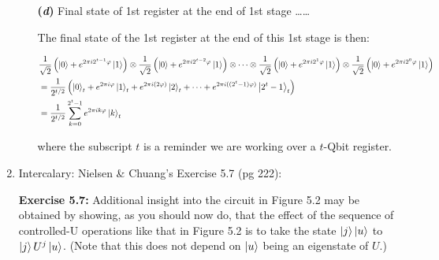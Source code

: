\documentclass{article}
\begin{document}
\begin{enumerate}[label=\textbf{(\arabic*)}]
\begin{itemize}
\vspace{0.1in}

\item[\textbf{(\textit{d})}] Final state of 1st register at the end of 1st stage \ldots \ldots
  
  \vspace{0.05in}
  
  The final state of the 1st register at the end of this 1st stage is then:

  \begin{align}
      \label{eq:1st_stage_1st_register}
      &\frac{1}{\sqrt{2}}\left(\ket{0}+e^{2\pi i 2^{t-1}\varphi}\ket{1}\right)
      \otimes
      \frac{1}{\sqrt{2}}\left(\ket{0}+e^{2\pi i 2^{t-2}\varphi}\ket{1}\right)
      \otimes
      \cdots
      \otimes
      \frac{1}{\sqrt{2}}\left(\ket{0}+e^{2\pi i 2^1\varphi}\ket{1}\right)
      \otimes
      \frac{1}{\sqrt{2}}\left(\ket{0}+e^{2\pi i 2^0\varphi}\ket{1}\right)\\
      &=
      \frac{1}{2^{t/2}}\left(
      \ket{0}_{t}
      + e^{2\pi i \varphi}\ket{1}_{t}
      + e^{2\pi i (2\varphi)}\ket{2}_{t}
      + \cdots
      + e^{2\pi i ((2^t-1)\varphi)}\ket{2^t-1}_{t}
      \right)\\
      &=
      \frac{1}{2^{t/2}}
      \sum_{k=0}^{2^t-1}
      e^{2\pi i k\varphi}\ket{k}_{t}
  \end{align}
  
  where the subscript $t$ is a reminder we are working over a $t$-Qbit register.
  
\end{itemize}

\vspace{0.1in}


\item Intercalary: Nielsen \& Chuang's Exercise 5.7 (pg 222):
\vspace{0.1in}
\begin{adjustwidth}{100pt}{100pt}
\begin{mdframed}[hidealllines=true, backgroundcolor=gray!20]
\textbf{Exercise 5.7:} Additional insight into the circuit in Figure 5.2 may be obtained by showing, as you should now do, that the effect of the sequence of controlled-U operations like that in Figure 5.2 is to take the state $\ket{j}\ket{u}$ to $\ket{j}U^{j}\ket{u}$. (Note that this does not depend on $\ket{u}$ being an eigenstate of $U$.)
\end{mdframed}
\end{adjustwidth}


\end{enumerate}
\end{document}
